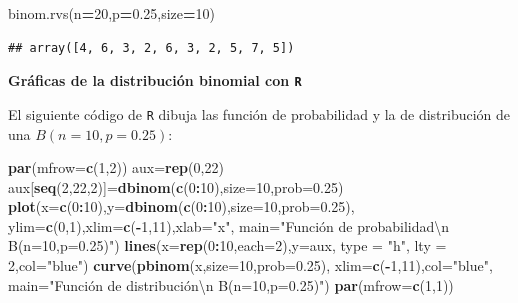 \documentclass[]{book}
\newenvironment{Shaded}{\begin{snugshade}}{\end{snugshade}}
\newcommand{\CharTok}[1]{\textcolor[rgb]{0.31,0.60,0.02}{#1}}
\newcommand{\DataTypeTok}[1]{\textcolor[rgb]{0.13,0.29,0.53}{#1}}
\newcommand{\DecValTok}[1]{\textcolor[rgb]{0.00,0.00,0.81}{#1}}
\newcommand{\FloatTok}[1]{\textcolor[rgb]{0.00,0.00,0.81}{#1}}
\newcommand{\KeywordTok}[1]{\textcolor[rgb]{0.13,0.29,0.53}{\textbf{#1}}}
\newcommand{\NormalTok}[1]{#1}
\newcommand{\OperatorTok}[1]{\textcolor[rgb]{0.81,0.36,0.00}{\textbf{#1}}}
\newcommand{\StringTok}[1]{\textcolor[rgb]{0.31,0.60,0.02}{#1}}
\begin{document}
\begin{Shaded}
\begin{Highlighting}[]
\NormalTok{binom.rvs(n}\OperatorTok{=}\DecValTok{20}\NormalTok{,p}\OperatorTok{=}\FloatTok{0.25}\NormalTok{,size}\OperatorTok{=}\DecValTok{10}\NormalTok{)}
\end{Highlighting}
\end{Shaded}

\begin{verbatim}
## array([4, 6, 3, 2, 6, 3, 2, 5, 7, 5])
\end{verbatim}

\textbf{Gráficas de la distribución binomial con \texttt{R}}

El siguiente código de \texttt{R} dibuja las función de probabilidad y la de distribución de una \(B(n=10,p=0.25)\):

\begin{Shaded}
\begin{Highlighting}[]
\KeywordTok{par}\NormalTok{(}\DataTypeTok{mfrow=}\KeywordTok{c}\NormalTok{(}\DecValTok{1}\NormalTok{,}\DecValTok{2}\NormalTok{))}
\NormalTok{aux=}\KeywordTok{rep}\NormalTok{(}\DecValTok{0}\NormalTok{,}\DecValTok{22}\NormalTok{)}
\NormalTok{aux[}\KeywordTok{seq}\NormalTok{(}\DecValTok{2}\NormalTok{,}\DecValTok{22}\NormalTok{,}\DecValTok{2}\NormalTok{)]=}\KeywordTok{dbinom}\NormalTok{(}\KeywordTok{c}\NormalTok{(}\DecValTok{0}\OperatorTok{:}\DecValTok{10}\NormalTok{),}\DataTypeTok{size=}\DecValTok{10}\NormalTok{,}\DataTypeTok{prob=}\FloatTok{0.25}\NormalTok{)}
\KeywordTok{plot}\NormalTok{(}\DataTypeTok{x=}\KeywordTok{c}\NormalTok{(}\DecValTok{0}\OperatorTok{:}\DecValTok{10}\NormalTok{),}\DataTypeTok{y=}\KeywordTok{dbinom}\NormalTok{(}\KeywordTok{c}\NormalTok{(}\DecValTok{0}\OperatorTok{:}\DecValTok{10}\NormalTok{),}\DataTypeTok{size=}\DecValTok{10}\NormalTok{,}\DataTypeTok{prob=}\FloatTok{0.25}\NormalTok{),}
  \DataTypeTok{ylim=}\KeywordTok{c}\NormalTok{(}\DecValTok{0}\NormalTok{,}\DecValTok{1}\NormalTok{),}\DataTypeTok{xlim=}\KeywordTok{c}\NormalTok{(}\OperatorTok{-}\DecValTok{1}\NormalTok{,}\DecValTok{11}\NormalTok{),}\DataTypeTok{xlab=}\StringTok{"x"}\NormalTok{,}
  \DataTypeTok{main=}\StringTok{"Función de probabilidad}\CharTok{\textbackslash{}n}\StringTok{ B(n=10,p=0.25)"}\NormalTok{)}
\KeywordTok{lines}\NormalTok{(}\DataTypeTok{x=}\KeywordTok{rep}\NormalTok{(}\DecValTok{0}\OperatorTok{:}\DecValTok{10}\NormalTok{,}\DataTypeTok{each=}\DecValTok{2}\NormalTok{),}\DataTypeTok{y=}\NormalTok{aux, }\DataTypeTok{type =} \StringTok{"h"}\NormalTok{, }\DataTypeTok{lty =} \DecValTok{2}\NormalTok{,}\DataTypeTok{col=}\StringTok{"blue"}\NormalTok{)}
\KeywordTok{curve}\NormalTok{(}\KeywordTok{pbinom}\NormalTok{(x,}\DataTypeTok{size=}\DecValTok{10}\NormalTok{,}\DataTypeTok{prob=}\FloatTok{0.25}\NormalTok{),}
  \DataTypeTok{xlim=}\KeywordTok{c}\NormalTok{(}\OperatorTok{-}\DecValTok{1}\NormalTok{,}\DecValTok{11}\NormalTok{),}\DataTypeTok{col=}\StringTok{"blue"}\NormalTok{,}
  \DataTypeTok{main=}\StringTok{"Función de distribución\textbackslash{}n B(n=10,p=0.25)"}\NormalTok{)}
\KeywordTok{par}\NormalTok{(}\DataTypeTok{mfrow=}\KeywordTok{c}\NormalTok{(}\DecValTok{1}\NormalTok{,}\DecValTok{1}\NormalTok{))}
\end{Highlighting}
\end{Shaded}
\end{document}
